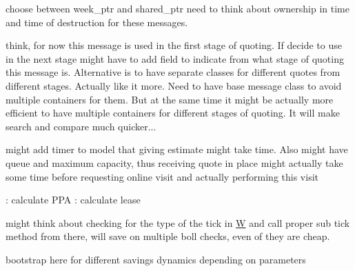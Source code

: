 \begin{DoxyRefList}
choose between week\+\_\+ptr and shared\+\_\+ptr need to think about ownership in time and time of destruction for these messages.  
\item[\label{_dev_stage2__DevStage2000024}%
\hypertarget{_dev_stage2__DevStage2000024}{}%
Class \hyperlink{classsolar__core_1_1_mes_marketing_s_e_i_online_quote}{solar\+\_\+core\+:\+:Mes\+Marketing\+S\+E\+I\+Online\+Quote} ]think, for now this message is used in the first stage of quoting. If decide to use in the next stage might have to add field to indicate from what stage of quoting this message is. Alternative is to have separate classes for different quotes from different stages. Actually like it more. Need to have base message class to avoid multiple containers for them. But at the same time it might be actually more efficient to have multiple containers for different stages of quoting. It will make search and compare much quicker... 
\item[\label{_dev_stage2__DevStage2000016}%
\hypertarget{_dev_stage2__DevStage2000016}{}%
Class \hyperlink{classsolar__core_1_1_s_e_i}{solar\+\_\+core\+:\+:S\+E\+I} ]might add timer to model that giving estimate might take time. Also might have queue and maximum capacity, thus receiving quote in place might actually take some time before requesting online visit and actually performing this visit 
\item[\label{_dev_stage2__DevStage2000015}%
\hypertarget{_dev_stage2__DevStage2000015}{}%
Member \hyperlink{classsolar__core_1_1_s_e_i_ab84401c625f5c459accf430535e4a06d}{solar\+\_\+core\+:\+:S\+E\+I\+:\+:ac\+\_\+estimate\+\_\+savings} (\hyperlink{classsolar__core_1_1_p_v_design}{P\+V\+Design} \&design, std\+::shared\+\_\+ptr$<$ P\+V\+Project $>$ project\+\_\+)]\+: calculate P\+P\+A \+: calculate lease  
\item[\label{_dev_stage2__DevStage2000017}%
\hypertarget{_dev_stage2__DevStage2000017}{}%
Member \hyperlink{classsolar__core_1_1_s_e_i_ab0bd6ae650afc15fe71ce545373ab16e}{solar\+\_\+core\+:\+:S\+E\+I\+:\+:act\+\_\+tick} ()]might think about checking for the type of the tick in \hyperlink{classsolar__core_1_1_w}{W} and call proper sub tick method from there, will save on multiple boll checks, even of they are cheap.  
\item[\label{_dev_stage2__DevStage2000014}%
\hypertarget{_dev_stage2__DevStage2000014}{}%
Member \hyperlink{classsolar__core_1_1_s_e_i_a807561ad055ddc0df91b80ba406ee6df}{solar\+\_\+core\+:\+:S\+E\+I\+:\+:form\+\_\+design} (std\+::shared\+\_\+ptr$<$ P\+V\+Project $>$ project\+\_\+)]bootstrap here for different savings dynamics depending on parameters  

\end{DoxyRefList}
